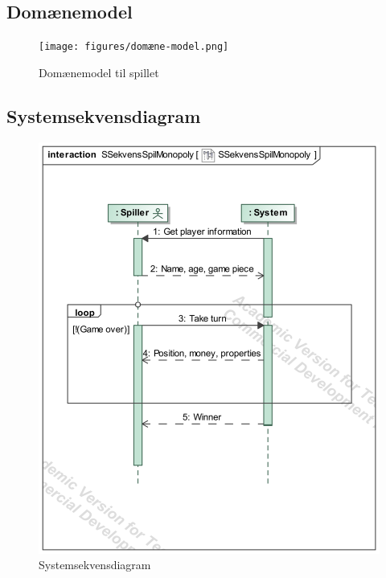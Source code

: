 \documentclass[../main.tex]{subfiles}
\begin{document}
\subsection{Domænemodel}
\begin{figure}[H]
    \centering
    \texttt{[image: figures/domæne-model.png]}
    \caption{Domænemodel til spillet}
    \label{fig:domain}
\end{figure}


\subsection{Systemsekvensdiagram}
\begin{figure}[H]
    \centering
    \includegraphics[width=0.7\linewidth]{figures/sekvensDiagrammer/SSekvensSpilMonopoly.png}
    \caption{Systemsekvensdiagram}
    \label{fig:systemsekvens}
\end{figure}
\end{document}
